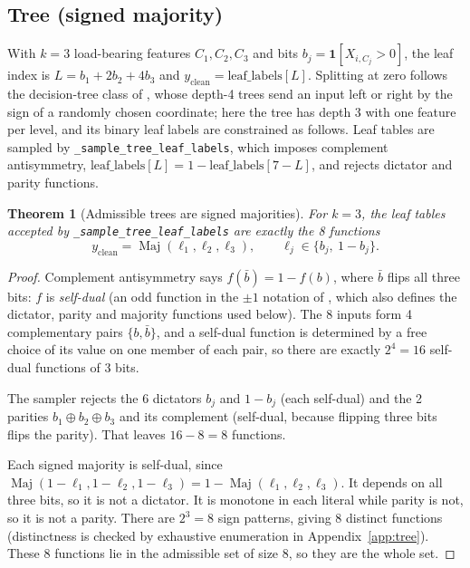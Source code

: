 \documentclass[11pt,a4paper]{article}
\newcommand{\1}{\mathbf{1}}
\DeclareMathOperator{\Maj}{Maj}
\theoremstyle{plain}
\newtheorem{theorem}{Theorem}[section]
\theoremstyle{definition}
\theoremstyle{remark}
\begin{document}
\subsection{Tree (signed majority)}
\label{sec:tree}

With $k = 3$ load-bearing features $C_1, C_2, C_3$ and bits
$b_j = \1[X_{i,C_j} > 0]$, the leaf index is
$L = b_1 + 2b_2 + 4b_3$ and $y_{\mathrm{clean}} = \text{leaf\_labels}[L]$.
Splitting at zero follows the decision-tree class of \citet{garg2022what},
whose depth-4 trees send an input left or right by the sign of a randomly
chosen coordinate; here the tree has depth 3 with one feature per level,
and its binary leaf labels are constrained as follows.
Leaf tables are sampled by \texttt{\_sample\_tree\_leaf\_labels}, which
imposes complement antisymmetry, $\text{leaf\_labels}[L] =
1 - \text{leaf\_labels}[7-L]$, and rejects dictator and parity functions.

\begin{theorem}[Admissible trees are signed majorities]
\label{thm:tree}
For $k=3$, the leaf tables accepted by \texttt{\_sample\_tree\_leaf\_labels}
are exactly the 8 functions
\[
  y_{\mathrm{clean}} = \Maj(\ell_1, \ell_2, \ell_3), \qquad
  \ell_j \in \{b_j,\ 1 - b_j\}.
\]
\end{theorem}
\begin{proof}
Complement antisymmetry says $f(\bar b) = 1 - f(b)$, where $\bar b$ flips
all three bits: $f$ is \emph{self-dual} (an odd function in the $\pm 1$
notation of \citealp{odonnell2014analysis}, which also defines the dictator,
parity and majority functions used below). The 8 inputs form 4 complementary
pairs $\{b, \bar b\}$, and a self-dual function is determined by a free
choice of its value on one member of each pair, so there are exactly
$2^4 = 16$ self-dual functions of 3 bits.

The sampler rejects the 6 dictators $b_j$ and $1-b_j$ (each self-dual) and
the 2 parities $b_1 \oplus b_2 \oplus b_3$ and its complement (self-dual,
because flipping three bits flips the parity). That leaves $16 - 8 = 8$
functions.

Each signed majority is self-dual, since
$\Maj(1-\ell_1, 1-\ell_2, 1-\ell_3) = 1 - \Maj(\ell_1,\ell_2,\ell_3)$. It
depends on all three bits, so it is not a dictator. It is monotone in each
literal while parity is not, so it is not a parity. There are $2^3 = 8$ sign
patterns, giving 8 distinct functions (distinctness is checked by exhaustive
enumeration in Appendix~\ref{app:tree}). These 8 functions lie in the
admissible set of size 8, so they are the whole set.
\end{proof}
\end{document}
